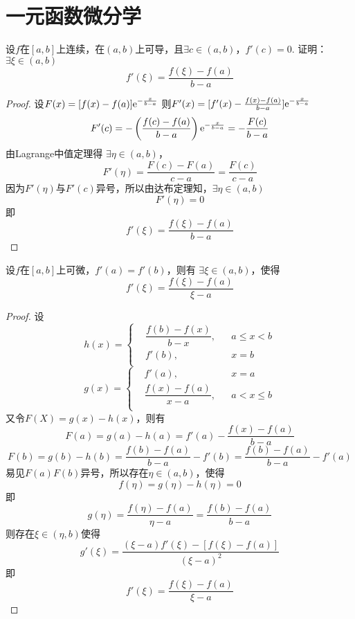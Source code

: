 \section{一元函数微分学}

\begin{proposition}
    
    设$f$在$[a,b]$上连续，在$(a,b)$上可导，且$\exists c\in (a,b)$，$f'(c)= 0$.
    证明：$\exists \xi \in (a,b)$
    $$f'(\xi) = \dfrac{f(\xi)-f(a)}{b-a}$$

\end{proposition}

\begin{proof}
    
    设$F(x)= [f(x)-f(a)]\mathrm{e}^{-\frac{x}{b-a}}$
    则$F'(x)=[f'(x)-\frac{f(x)-f(a)}{b-a}]\mathrm{e}^{-\frac{x}{b-a}}$
    $$F'(c)= -\left(\dfrac{f(c)-f(a)}{b-a}\right)\mathrm{e}^{-\frac{x}{b-a}} = -\dfrac{F(c)}{b-a}$$
    由\textup{Lagrange}中值定理得
    $\exists \eta \in (a,b)$，
    $$F'(\eta) = \dfrac{F(c)-F(a)}{c-a} = \dfrac{F(c)}{c-a}$$
    因为$F'(\eta)$与$F'(c)$异号，所以由达布定理知，$\exists \eta \in (a,b)$
    $$F'(\eta) = 0$$
    即
    $$f'(\xi) = \dfrac{f(\xi)-f(a)}{b-a}$$

\end{proof}

\begin{theorem}[Flett中值定理]
    
    设$f$在$[a,b]$上可微，$f'(a)=f'(b)$，则有
    $\exists \xi \in (a,b)$，使得
    $$f'(\xi) = \dfrac{f(\xi)-f(a)}{\xi - a}$$

\end{theorem}

\begin{proof}
    
    设$$h(x) = \left\{
        \begin{aligned}
            & \dfrac{f(b)-f(x)}{b-x}, &&a \leq x < b\\
            &f'(b), &&x = b\\
        \end{aligned}
    \right.
    $$
    $$g(x) = \left\{
        \begin{aligned}
            &f'(a), &&x = a\\
            & \dfrac{f(x)-f(a)}{x-a}, &&a < x \leq b\\
        \end{aligned}
    \right.
    $$
    又令$F(X)=g(x)-h(x)$，则有
    $$F(a) = g(a) - h(a) = f'(a) - \dfrac{f(x)-f(a)}{b-a}$$
    $$F(b) = g(b) - h(b) = \dfrac{f(b) - f(a)}{b-a}  - f'(b) = \dfrac{f(b) - f(a)}{b-a} - f'(a)$$
    易见$F(a)F(b)$异号，所以存在$\eta \in (a,b)$，使得
    $$ f(\eta) = g(\eta) -h(\eta) = 0$$
    即
    $$g(\eta) = \dfrac{f(\eta) - f(a)}{\eta - a } =  \dfrac{f(b) - f(a)}{b-a}$$
    则存在$\xi \in (\eta,b)$使得
    $$g'(\xi) = \dfrac{(\xi - a)f'(\xi)-[f(\xi) - f(a)]}{(\xi - a)^2}$$
    即
    $$f'(\xi) = \dfrac{f(\xi) - f(a)}{\xi - a}$$

\end{proof}

